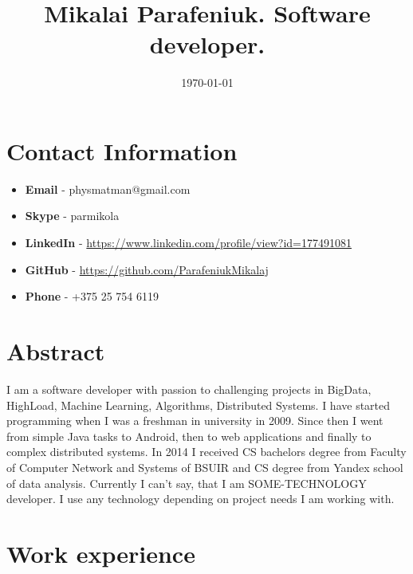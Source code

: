\documentclass{article}
\title{Mikalai Parafeniuk. Software developer.}
\date{\today}
\begin{document}
\maketitle

\section*{Contact Information}
\begin{itemize}
\item \textbf{Email} - physmatman@gmail.com
\item \textbf{Skype} - parmikola
\item \textbf{LinkedIn} - \url{https://www.linkedin.com/profile/view?id=177491081}
\item \textbf{GitHub} - \url{https://github.com/ParafeniukMikalaj}
\item \textbf{Phone} - +375 25 754 6119
\end{itemize}

\section*{Abstract}
I am a software developer with passion to challenging projects in BigData, HighLoad, Machine Learning, Algorithms, Distributed Systems. I have started programming when I was a freshman in university in 2009. Since then I went from simple Java tasks to Android, then to web applications and finally to complex distributed systems. In 2014 I received CS bachelors degree from Faculty of Computer Network and Systems of BSUIR and CS degree from Yandex school of data analysis. Currently I can't say, that I am SOME-TECHNOLOGY developer. I use any technology depending on project needs I am working with.

\section*{Work experience}
\end{document}
